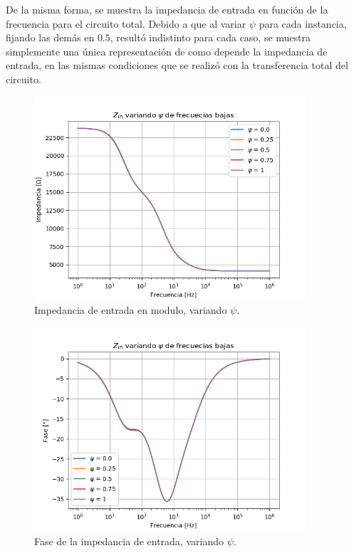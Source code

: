\documentclass[a4paper]{article}
\begin{document}
De la misma forma, se muestra la impedancia de entrada en función de la frecuencia para el circuito total. Debido a que al variar $\psi$ para cada instancia, fijando las demás en $0.5$, resultó indistinto para cada caso, se muestra simplemente una única representación de como depende la impedancia de entrada, en las mismas condiciones que se realizó con la transferencia total del circuito.
\begin{figure}[H]
\centering
	\includegraphics[width=0.9\textwidth, trim = {0 0 0 1.35cm}, clip]{Imagenes/Zin-Low-Mod.png}
	\caption{Impedancia de entrada en modulo, variando $\psi$.}
	\label{fig:zin_modulo_low}
\end{figure}
\begin{figure}[H]
\centering
	\includegraphics[width=0.9\textwidth, trim = {0 0 0 1.35cm}, clip]{Imagenes/Zin-Low-Ph.png}
	\caption{Fase de la impedancia de entrada, variando $\psi$.}
	\label{fig:zin_ph_low}
\end{figure}
\end{document}
